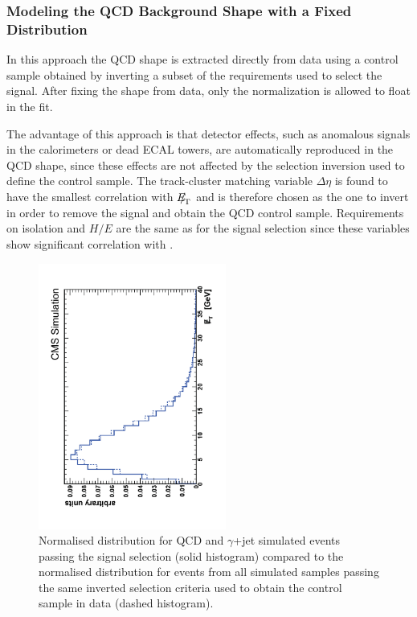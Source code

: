 \subsubsection{Modeling the QCD Background Shape with a Fixed Distribution}
\label{sec:e-Wsigextr-FixedTemplate}

In this approach the QCD shape is extracted directly from data using a 
control sample obtained by inverting a subset of the requirements used to select the 
signal. After fixing the shape from data,
only the normalization is allowed to float in the fit.  

The advantage of this approach 
is that detector effects, such as anomalous signals in the ca\-lo\-ri\-me\-ters or 
dead ECAL towers, are automatically reproduced in the QCD shape, since these 
effects are not affected by the selection inversion used to define the control sample.
The track-cluster matching variable $\Delta\eta$ is found
to have the smallest correlation with ${E\!\!\!/}_{\!\mathrm{T}}$ and is therefore chosen as the one 
to invert in order to remove the signal and obtain the QCD control sample.  
Requirements on isolation and $H/E$ are the same as for the signal 
selection since these variables show significant correlation with \MET. 
\begin{figure}[h!]
  \begin{center}
    \includegraphics*[angle=-90,width=0.55\textwidth]{figs/antiselShape.pdf}
    \caption{Normalised \MET distribution for QCD and $\gamma$+jet simulated 
events passing the signal selection (solid histogram) compared 
to the normalised distribution for events from all simulated samples passing
the same inverted selection criteria used to obtain the control sample in data
(dashed histogram).}
    \label{fig:antiselShape}
  \end{center}
\end{figure}

